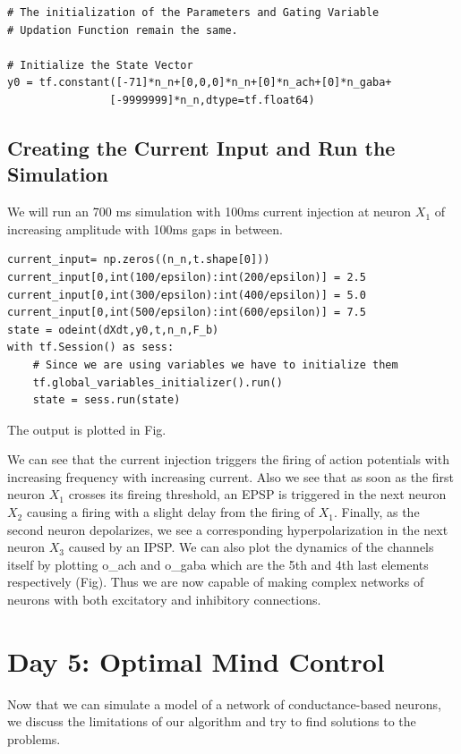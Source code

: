 \documentclass[10pt,letterpaper]{article}
\begin{document}
\begin{verbatim}
# The initialization of the Parameters and Gating Variable
# Updation Function remain the same.

# Initialize the State Vector
y0 = tf.constant([-71]*n_n+[0,0,0]*n_n+[0]*n_ach+[0]*n_gaba+
				[-9999999]*n_n,dtype=tf.float64)
\end{verbatim}

\subsection*{Creating the Current Input and Run the Simulation}

We will run an 700 ms simulation with 100ms current injection at neuron $X_1$ of increasing amplitude with 100ms gaps in between.

\begin{verbatim}
current_input= np.zeros((n_n,t.shape[0]))
current_input[0,int(100/epsilon):int(200/epsilon)] = 2.5
current_input[0,int(300/epsilon):int(400/epsilon)] = 5.0
current_input[0,int(500/epsilon):int(600/epsilon)] = 7.5
state = odeint(dXdt,y0,t,n_n,F_b)
with tf.Session() as sess:
    # Since we are using variables we have to initialize them
    tf.global_variables_initializer().run()
    state = sess.run(state)
\end{verbatim}

The output is plotted in Fig.

We can see that the current injection triggers the firing of action potentials with increasing frequency with increasing current. Also we see that as soon as the first neuron $X_1$ crosses its fireing threshold, an EPSP is triggered in the next neuron $X_2$ causing a firing with a slight delay from the firing of $X_1$. Finally, as the second neuron depolarizes, we see a corresponding hyperpolarization in the next neuron $X_3$ caused by an IPSP. We can also plot the dynamics of the channels itself by plotting o\_ach and o\_gaba which are the 5th and 4th last elements respectively (Fig). Thus we are now capable of making complex networks of neurons with both excitatory and inhibitory connections.

\section*{Day 5: Optimal Mind Control}
Now that we can simulate a model of a network of conductance-based neurons, we discuss the limitations of our algorithm and try to find solutions to the problems.
\end{document}
